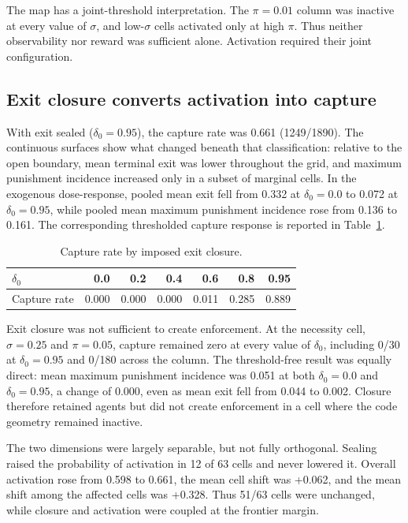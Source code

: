 The map has a joint-threshold interpretation. The $\pi=0.01$ column was inactive at every value of $\sigma$, and low-$\sigma$ cells activated only at high $\pi$. Thus neither observability nor reward was sufficient alone. Activation required their joint configuration.

\subsection{Exit closure converts activation into capture}

With exit sealed ($\delta_0=0.95$), the capture rate was 0.661 (1249/1890). The continuous surfaces show what changed beneath that classification: relative to the open boundary, mean terminal exit was lower throughout the grid, and maximum punishment incidence increased only in a subset of marginal cells. In the exogenous dose-response, pooled mean exit fell from 0.332 at $\delta_0=0.0$ to 0.072 at $\delta_0=0.95$, while pooled mean maximum punishment incidence rose from 0.136 to 0.161. The corresponding thresholded capture response is reported in Table~\ref{tab:dose-response}.

\begin{table}[htbp]
\centering
\caption{Capture rate by imposed exit closure.}
\label{tab:dose-response}
\begin{tabular}{lrrrrrr}
\hline
$\delta_0$ & 0.0 & 0.2 & 0.4 & 0.6 & 0.8 & 0.95 \\
\hline
Capture rate & 0.000 & 0.000 & 0.000 & 0.011 & 0.285 & 0.889 \\
\hline
\end{tabular}
\end{table}

Exit closure was not sufficient to create enforcement. At the necessity cell, $\sigma=0.25$ and $\pi=0.05$, capture remained zero at every value of $\delta_0$, including 0/30 at $\delta_0=0.95$ and 0/180 across the column. The threshold-free result was equally direct: mean maximum punishment incidence was 0.051 at both $\delta_0=0.0$ and $\delta_0=0.95$, a change of 0.000, even as mean exit fell from 0.044 to 0.002. Closure therefore retained agents but did not create enforcement in a cell where the code geometry remained inactive.

The two dimensions were largely separable, but not fully orthogonal. Sealing raised the probability of activation in 12 of 63 cells and never lowered it. Overall activation rose from 0.598 to 0.661, the mean cell shift was +0.062, and the mean shift among the affected cells was +0.328. Thus 51/63 cells were unchanged, while closure and activation were coupled at the frontier margin.

